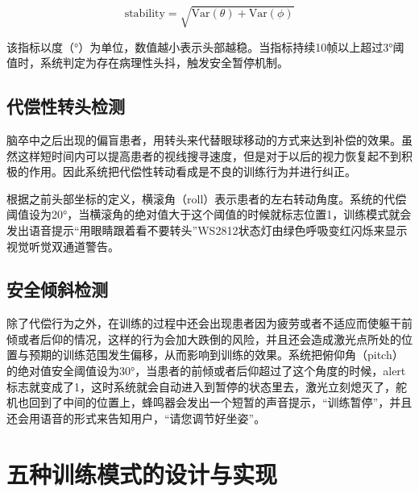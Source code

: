 \begin{equation}
\text{stability} = \sqrt{\text{Var}(\theta) + \text{Var}(\phi)}
\label{eq:stability}
\end{equation}

该指标以度（°）为单位，数值越小表示头部越稳。当指标持续10帧以上超过3°阈值时，系统判定为存在病理性头抖，触发安全暂停机制。

\subsection{代偿性转头检测}

脑卒中之后出现的偏盲患者，用转头来代替眼球移动的方式来达到补偿的效果。虽然这样短时间内可以提高患者的视线搜寻速度，但是对于以后的视力恢复起不到积极的作用。因此系统把代偿性转动看成是不良的训练行为并进行纠正。

根据之前头部坐标的定义，横滚角（roll）表示患者的左右转动角度。系统的代偿阈值设为20°，当横滚角的绝对值大于这个阈值的时候就标志位置1，训练模式就会发出语音提示“用眼睛跟着看不要转头”WS2812状态灯由绿色呼吸变红闪烁来显示视觉听觉双通道警告。

\subsection{安全倾斜检测}

除了代偿行为之外，在训练的过程中还会出现患者因为疲劳或者不适应而使躯干前倾或者后仰的情况，这样的行为会加大跌倒的风险，并且还会造成激光点所处的位置与预期的训练范围发生偏移，从而影响到训练的效果。系统把俯仰角（pitch）的绝对值安全阈值设为30°，当患者的前倾或者后仰超过了这个角度的时候，alert标志就变成了1，这时系统就会自动进入到暂停的状态里去，激光立刻熄灭了，舵机也回到了中间的位置上，蜂鸣器会发出一个短暂的声音提示，“训练暂停”，并且还会用语音的形式来告知用户，“请您调节好坐姿”。



\section{五种训练模式的设计与实现}

